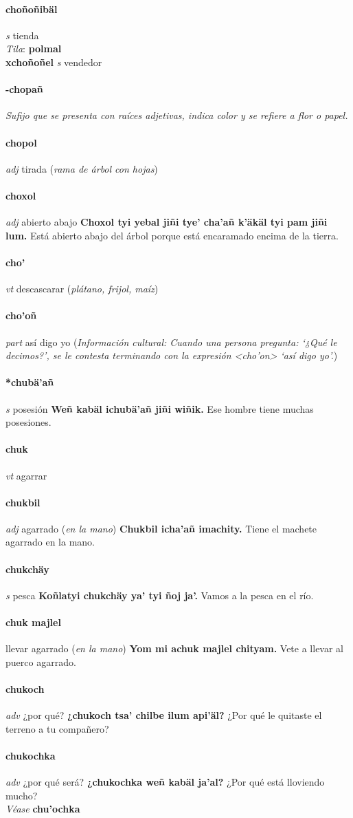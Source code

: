 \documentclass{scrbook}
\newcommand{\entry}[1]{\paragraph{#1}}
\newcommand{\nontranslationdef}[1]{\textit{#1}}
\newcommand{\partofspeech}[1]{\textit{#1}}
\newcommand{\spanishtranslation}[1]{#1}
\newcommand{\clarification}[1]{(\textit{#1})}
\newcommand{\cholexample}[1]{\textbf{#1}}
\newcommand{\exampletranslation}[1]{#1}
\newcommand{\dialectvariant}[1]{\\\textit{#1}:}
\newcommand{\dialectword}[1]{\textbf{#1}}
\newcommand{\alsosee}[1]{\\\textit{Véase} \textbf{#1}}
\newcommand{\culturalinformation}[1]{(\textit{#1})}
\newcommand{\secondaryentry}[1]{\\\textbf{#1}}
\newcommand{\secondpartofspeech}[1]{\textit{#1}}
\newcommand{\secondtranslation}[1]{#1}
\begin{document}
\begin{multicols}{2}
\entry{choñoñibäl}
\partofspeech{s}
\spanishtranslation{tienda}
\dialectvariant{Tila}
\dialectword{polmal}
\secondaryentry{xchoñoñel}
\secondpartofspeech{s}
\secondtranslation{vendedor}

\entry{-chopañ}
\nontranslationdef{Sufijo que se presenta con raíces adjetivas, indica color y se refiere a flor o papel.}

\entry{chopol}
\partofspeech{adj}
\spanishtranslation{tirada}
\clarification{rama de árbol con hojas}

\entry{choxol}
\partofspeech{adj}
\spanishtranslation{abierto abajo}
\cholexample{Choxol tyi yebal jiñi tye' cha'añ k'äkäl tyi pam jiñi lum.}
\exampletranslation{Está abierto abajo del árbol porque está encaramado encima de la tierra.}

\entry{cho'}
\partofspeech{vt}
\spanishtranslation{descascarar}
\clarification{plátano, frijol, maíz}

\entry{cho'oñ}
\partofspeech{part}
\spanishtranslation{así digo yo}
\culturalinformation{Información cultural: Cuando una persona pregunta: ‘¿Qué le decimos?’, se le contesta terminando con la expresión <cho'on> ‘así digo yo’.}

\entry{*chubä'añ}
\partofspeech{s}
\spanishtranslation{posesión}
\cholexample{Weñ kabäl ichubä'añ jiñi wiñik.}
\exampletranslation{Ese hombre tiene muchas posesiones.}

\entry{chuk}
\partofspeech{vt}
\spanishtranslation{agarrar}

\entry{chukbil}
\partofspeech{adj}
\spanishtranslation{agarrado}
\clarification{en la mano}
\cholexample{Chukbil icha'añ imachity.}
\exampletranslation{Tiene el machete agarrado en la mano.}

\entry{chukchäy}
\partofspeech{s}
\spanishtranslation{pesca}
\cholexample{Koñlatyi chukchäy ya' tyi ñoj ja'.}
\exampletranslation{Vamos a la pesca en el río.}

\entry{chuk majlel}
\spanishtranslation{llevar agarrado}
\clarification{en la mano}
\cholexample{Yom mi achuk majlel chityam.}
\exampletranslation{Vete a llevar al puerco agarrado.}

\entry{chukoch}
\partofspeech{adv}
\spanishtranslation{¿por qué?}
\cholexample{¿chukoch tsa' chilbe ilum api'äl?}
\exampletranslation{¿Por qué le quitaste el terreno a tu compañero?}

\entry{chukochka}
\partofspeech{adv}
\spanishtranslation{¿por qué será?}
\cholexample{¿chukochka weñ kabäl ja'al?}
\exampletranslation{¿Por qué está lloviendo mucho?}
\alsosee{chu'ochka}


\end{multicols}
\end{document}
